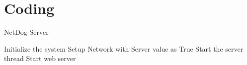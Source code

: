 \chapter{Coding}

\begin{algorithm}
\begin{algorithmic}
\caption{NetDog Server}
\State Initialize the system 
\State Setup Network with Server value as True
\State Start the server thread
\State Start web server
\end{algorithmic}
\end{algorithm}

